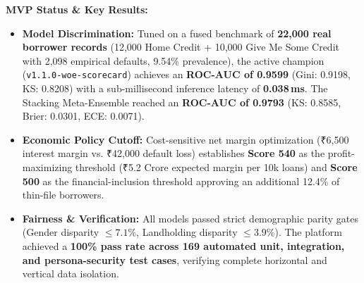 \vspace{0.3cm}
\noindent\textbf{MVP Status \& Key Results:}
\begin{itemize}[leftmargin=1.5em, itemsep=2pt]
  \item \textbf{Model Discrimination:} Tuned on a fused benchmark of \textbf{22,000 real borrower records} (12,000 Home Credit + 10,000 Give Me Some Credit with 2,098 empirical defaults, 9.54\% prevalence), the active champion (\texttt{v1.1.0-woe-scorecard}) achieves an \textbf{ROC-AUC of 0.9599} (Gini: 0.9198, KS: 0.8208) with a sub-millisecond inference latency of \textbf{0.038\,ms}. The Stacking Meta-Ensemble reached an \textbf{ROC-AUC of 0.9793} (KS: 0.8585, Brier: 0.0301, ECE: 0.0071).
  \item \textbf{Economic Policy Cutoff:} Cost-sensitive net margin optimization (₹6,500 interest margin vs. ₹42,000 default loss) establishes \textbf{Score 540} as the profit-maximizing threshold (₹5.2 Crore expected margin per 10k loans) and \textbf{Score 500} as the financial-inclusion threshold approving an additional 12.4\% of thin-file borrowers.
  \item \textbf{Fairness \& Verification:} All models passed strict demographic parity gates (Gender disparity $\le 7.1\%$, Landholding disparity $\le 3.9\%$). The platform achieved a \textbf{100\% pass rate across 169 automated unit, integration, and persona-security test cases}, verifying complete horizontal and vertical data isolation.
\end{itemize}

